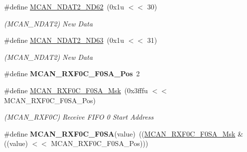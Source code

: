 \begin{DoxyCompactItemize}
\mbox{\label{group__SAMV71__MCAN_ga779143a5d8a8209677163e87b8fb0dcc}} 
\#define \mbox{\hyperlink{group__SAMV71__MCAN_ga779143a5d8a8209677163e87b8fb0dcc}{M\+C\+A\+N\+\_\+\+N\+D\+A\+T2\+\_\+\+N\+D62}}~(0x1u $<$$<$ 30)
\begin{DoxyCompactList}\small\item\em (M\+C\+A\+N\+\_\+\+N\+D\+A\+T2) New Data \end{DoxyCompactList}\item 
\mbox{\label{group__SAMV71__MCAN_gaa1694e1c7b0cb07db2bc1979d6b73bd7}} 
\#define \mbox{\hyperlink{group__SAMV71__MCAN_gaa1694e1c7b0cb07db2bc1979d6b73bd7}{M\+C\+A\+N\+\_\+\+N\+D\+A\+T2\+\_\+\+N\+D63}}~(0x1u $<$$<$ 31)
\begin{DoxyCompactList}\small\item\em (M\+C\+A\+N\+\_\+\+N\+D\+A\+T2) New Data \end{DoxyCompactList}\item 
\mbox{\label{group__SAMV71__MCAN_gad6ec1a0ed1f07739fa7046c8c9c88404}} 
\#define {\bfseries M\+C\+A\+N\+\_\+\+R\+X\+F0\+C\+\_\+\+F0\+S\+A\+\_\+\+Pos}~2
\item 
\mbox{\label{group__SAMV71__MCAN_ga72d0d65e07264dd53cd05ad1ffa07031}} 
\#define \mbox{\hyperlink{group__SAMV71__MCAN_ga72d0d65e07264dd53cd05ad1ffa07031}{M\+C\+A\+N\+\_\+\+R\+X\+F0\+C\+\_\+\+F0\+S\+A\+\_\+\+Msk}}~(0x3fffu $<$$<$ M\+C\+A\+N\+\_\+\+R\+X\+F0\+C\+\_\+\+F0\+S\+A\+\_\+\+Pos)
\begin{DoxyCompactList}\small\item\em (M\+C\+A\+N\+\_\+\+R\+X\+F0C) Receive F\+I\+FO 0 Start Address \end{DoxyCompactList}\item 
\mbox{\label{group__SAMV71__MCAN_gabe03c98aeb43528e343d32330cf7ed49}} 
\#define {\bfseries M\+C\+A\+N\+\_\+\+R\+X\+F0\+C\+\_\+\+F0\+SA}(value)~((\mbox{\hyperlink{group__SAMV71__MCAN_ga72d0d65e07264dd53cd05ad1ffa07031}{M\+C\+A\+N\+\_\+\+R\+X\+F0\+C\+\_\+\+F0\+S\+A\+\_\+\+Msk}} \& ((value) $<$$<$ M\+C\+A\+N\+\_\+\+R\+X\+F0\+C\+\_\+\+F0\+S\+A\+\_\+\+Pos)))
\item 
\mbox{\label{group__SAMV71__MCAN_ga9ddda33aad76a94703f65ad82c6e63cc}} 

\end{DoxyCompactItemize}
